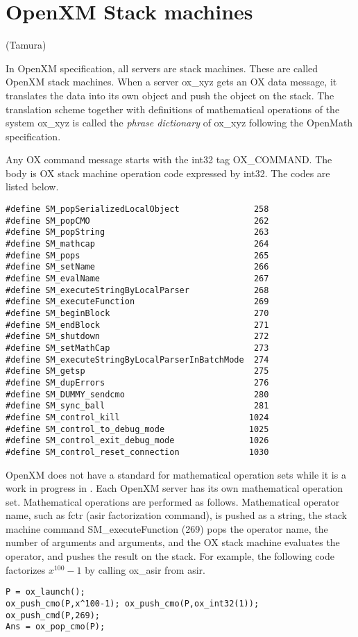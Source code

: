 
\section{OpenXM Stack machines}   (Tamura)

In OpenXM specification, all servers are stack machines.
These are called OpenXM stack machines.
When a server ox\_xyz gets an OX data message,
it translates the data into its own object and push the object
on the stack.
The translation scheme together with definitions of 
mathematical operations
of the system ox\_xyz is called the {\it phrase dictionary} of
ox\_xyz following the OpenMath specification.

Any OX command message starts with the int32 tag OX\_COMMAND.
The body is OX stack machine operation code expressed by int32.
The codes are listed below.
\begin{verbatim}
#define SM_popSerializedLocalObject               258
#define SM_popCMO                                 262
#define SM_popString                              263
#define SM_mathcap                                264
#define SM_pops                                   265
#define SM_setName                                266
#define SM_evalName                               267
#define SM_executeStringByLocalParser             268
#define SM_executeFunction                        269
#define SM_beginBlock                             270
#define SM_endBlock                               271
#define SM_shutdown                               272
#define SM_setMathCap                             273
#define SM_executeStringByLocalParserInBatchMode  274
#define SM_getsp                                  275
#define SM_dupErrors                              276
#define SM_DUMMY_sendcmo                          280
#define SM_sync_ball                              281
#define SM_control_kill                          1024
#define SM_control_to_debug_mode                 1025
#define SM_control_exit_debug_mode               1026
#define SM_control_reset_connection              1030
\end{verbatim}

OpenXM does not have a standard for mathematical operation sets
while it is a work in progress in \cite{gap}.
Each OpenXM server has its own mathematical operation set.
Mathematical operations are performed as follows.
Mathematical operator name, such as fctr (asir factorization command),
is pushed as a string,
the stack machine command
SM\_executeFunction (269) pops the operator name, the number of arguments
and arguments, and
the OX stack machine evaluates the operator, and pushes the result on the stack.
For example, the following code factorizes $x^{100}-1$ by calling
ox\_asir from asir.
\begin{verbatim}
P = ox_launch(); 
ox_push_cmo(P,x^100-1); ox_push_cmo(P,ox_int32(1));
ox_push_cmd(P,269); 
Ans = ox_pop_cmo(P);
\end{verbatim}

